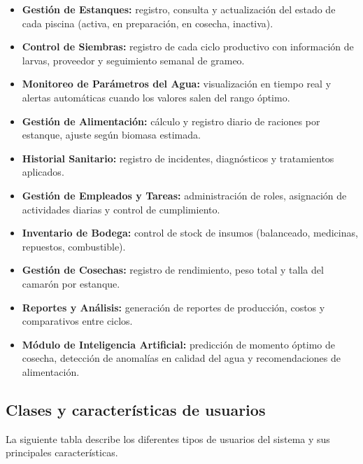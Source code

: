 \documentclass[11pt,a4paper]{article}
\begin{document}
\begin{itemize}
    \item \textbf{Gestión de Estanques:} registro, consulta y actualización del estado de cada piscina (activa, en preparación, en cosecha, inactiva).
    
    \item \textbf{Control de Siembras:} registro de cada ciclo productivo con información de larvas, proveedor y seguimiento semanal de grameo.
    
    \item \textbf{Monitoreo de Parámetros del Agua:} visualización en tiempo real y alertas automáticas cuando los valores salen del rango óptimo.
    
    \item \textbf{Gestión de Alimentación:} cálculo y registro diario de raciones por estanque, ajuste según biomasa estimada.
    
    \item \textbf{Historial Sanitario:} registro de incidentes, diagnósticos y tratamientos aplicados.
    
    \item \textbf{Gestión de Empleados y Tareas:} administración de roles, asignación de actividades diarias y control de cumplimiento.
    
    \item \textbf{Inventario de Bodega:} control de stock de insumos (balanceado, medicinas, repuestos, combustible).
    
    \item \textbf{Gestión de Cosechas:} registro de rendimiento, peso total y talla del camarón por estanque.
    
    \item \textbf{Reportes y Análisis:} generación de reportes de producción, costos y comparativos entre ciclos.
    
    \item \textbf{Módulo de Inteligencia Artificial:} predicción de momento óptimo de cosecha, detección de anomalías en calidad del agua y recomendaciones de alimentación.
\end{itemize}

\subsection{Clases y características de usuarios}
La siguiente tabla describe los diferentes tipos de usuarios del sistema y sus principales características.
\end{document}
